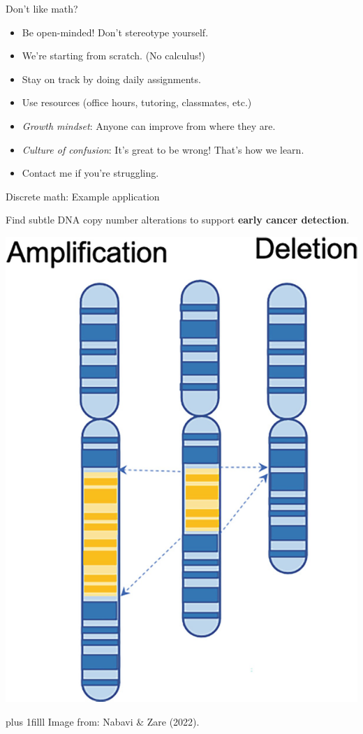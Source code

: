 \documentclass[t, aspectratio = 137, xcolor=dvipsnames,table,compress]{beamer}
\newcommand{\citebottom}[1]{
\vskip0pt plus 1filll  \tiny {#1}
}
\begin{document}
\begin{frame}{Don't like math?}

\begin{itemize}
	\item Be open-minded!  Don't stereotype yourself.  %
	\item We're starting from scratch. (No calculus!)
	\item Stay on track by doing daily assignments.
	\item Use resources (office hours, tutoring, classmates, etc.)
	\item \textit{Growth mindset}: Anyone can improve from where they are.   
	\item \textit{Culture of confusion}: It's great to be wrong! That's how we learn. 
	\item Contact me if you're struggling.
\end{itemize}

\end{frame}


\begin{frame}{Discrete math: Example application}


Find subtle DNA copy number alterations to support \textbf{early cancer detection}.

\centering \includegraphics[width=.2\textwidth]{images/amplification_deletion} 

\citebottom{Image from: Nabavi \& Zare (2022).}

\end{frame}
\end{document}
